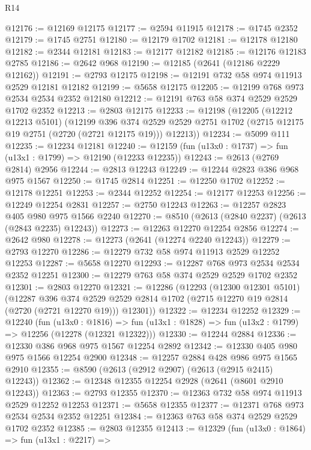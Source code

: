 \begin{lexlean}{R14}
\begin{coremodule}
@12176 := @12169 @12175
@12177 := @2594 @11915
@12178 := @1745 @2352
@12179 := @1745 @2751
@12180 := @12179 @1702
@12181 := @12178 @12180
@12182 := @2344 @12181
@12183 := @12177 @12182
@12185 := @12176 @12183 @2785
@12186 := @2642 @968
@12190 := @12185 (@2641 (@12186 @2229 @12162))
@12191 := @2793 @12175
@12198 := @12191 @732 @58 @974 @11913 @2529 @12181 @12182
@12199 := @5658 @12175
@12205 := @12199 @768 @973 @2534 @2534 @2352 @12180
@12212 := @12191 @763 @58 @374 @2529 @2529 @1702 @2352
@12213 := @2803 @12175
@12233 := @12198
    (@12205
      (@12212 @12213 @5101)
      (@12199
        @396
        @374
        @2529
        @2529
        @2751
        @1702
        (@2715 @12175 @19 @2751 (@2720 (@2721 @12175 @19)))
        @12213))
@12234 := @5099 @111
@12235 := @12234 @12181
@12240 := @12159 (fun (u13x0 : @1737) => fun (u13x1 : @1799) => @12190 (@12233 @12235))
@12243 := @2613 (@2769 @2814) @2956
@12244 := @2813 @12243
@12249 := @12244 @2823 @386 @968 @975 @1567
@12250 := @1745 @2814
@12251 := @12250 @1702
@12252 := @12178 @12251
@12253 := @2344 @12252
@12254 := @12177 @12253
@12256 := @12249 @12254 @2831
@12257 := @2750 @12243
@12263 := @12257 @2823 @405 @980 @975 @1566 @2240
@12270 := @8510 (@2613 (@2840 @2237) (@2613 (@2843 @2235) @12243))
@12273 := @12263 @12270 @12254 @2856
@12274 := @2642 @980
@12278 := @12273 (@2641 (@12274 @2240 @12243))
@12279 := @2793 @12270
@12286 := @12279 @732 @58 @974 @11913 @2529 @12252 @12253
@12287 := @5658 @12270
@12293 := @12287 @768 @973 @2534 @2534 @2352 @12251
@12300 := @12279 @763 @58 @374 @2529 @2529 @1702 @2352
@12301 := @2803 @12270
@12321 := @12286
    (@12293
      (@12300 @12301 @5101)
      (@12287
        @396
        @374
        @2529
        @2529
        @2814
        @1702
        (@2715 @12270 @19 @2814 (@2720 (@2721 @12270 @19)))
        @12301))
@12322 := @12234 @12252
@12329 := @12240
    (fun (u13x0 : @1816) =>
    fun (u13x1 : @1828) => fun (u13x2 : @1799) => @12256 (@12278 (@12321 @12322)))
@12330 := @12244 @2884
@12336 := @12330 @386 @968 @975 @1567 @12254 @2892
@12342 := @12330 @405 @980 @975 @1566 @12254 @2900
@12348 := @12257 @2884 @428 @986 @975 @1565 @2910
@12355 := @8590 (@2613 (@2912 @2907) (@2613 (@2915 @2415) @12243))
@12362 := @12348 @12355 @12254 @2928 (@2641 (@8601 @2910 @12243))
@12363 := @2793 @12355
@12370 := @12363 @732 @58 @974 @11913 @2529 @12252 @12253
@12371 := @5658 @12355
@12377 := @12371 @768 @973 @2534 @2534 @2352 @12251
@12384 := @12363 @763 @58 @374 @2529 @2529 @1702 @2352
@12385 := @2803 @12355
@12413 := @12329
    (fun (u13x0 : @1864) =>
    fun (u13x1 : @2217) =>

\end{coremodule}
\end{lexlean}
